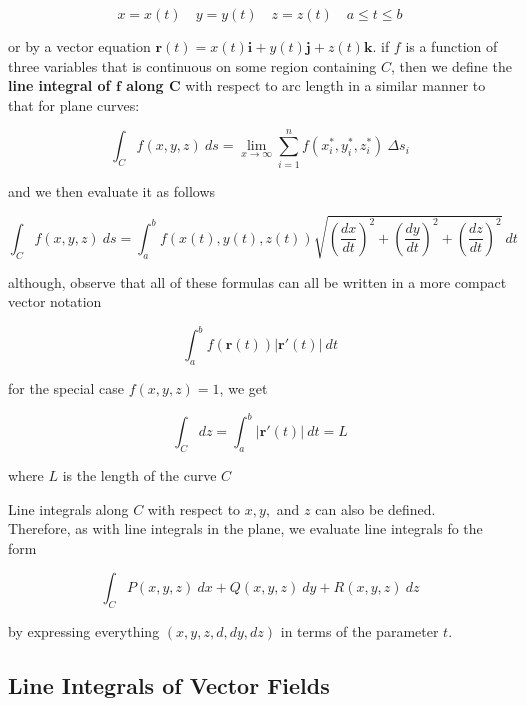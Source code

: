 \documentclass{article}
\begin{document}
\begin{equation*}
    x = x(t) \quad y = y(t) \quad z = z(t) \quad a \leq t \leq b
\end{equation*}

or by a vector equation $\mathbf{r}(t) = x(t) \mathbf{i} + y(t) \mathbf{j} + z(t) \mathbf{k}$. if $f$ is a function of three variables that is continuous on some region containing $C$, then we define the \textbf{ line integral of $\mathbf{f}$ along $\mathbf{C}$} with respect to arc length in a similar manner to that for plane curves:

\begin{equation*}
    \int_C f(x,y,z) \ ds = \lim_{x \rightarrow \infty} \sum_{i=1}^{n} f(x_i^*, y_i^*, z_i^*) \ \Delta s_i
\end{equation*}

and we then evaluate it as follows

\begin{equation*}
    \int_C f(x,y,z) \ ds = \int_{a}^{b} f(x(t), y(t), z(t)) \sqrt{(\frac{dx}{dt})^2 + (\frac{dy}{dt})^2 + (\frac{dz}{dt})^2} \ dt
\end{equation*}

although, observe that all of these formulas can all be written in a more compact vector notation 

\begin{equation*}
    \int_{a}^{b} f(\mathbf{r}(t)) \rvert \mathbf{r}'(t) \rvert \ dt 
\end{equation*}

for the special case $f(x,y,z) = 1$, we get 

\begin{equation*}
    \int_C dz = \int_{a}^{b} \rvert \mathbf{r}'(t) \rvert \ dt = L 
\end{equation*}

where $L$ is the length of the curve $C$

Line integrals along $C$ with respect to  $x, y, $ and $z$ can also be defined.
\\
Therefore, as with line integrals in the plane, we evaluate line integrals fo the form

\begin{equation*}
    \int_C P(x,y,z) \ dx + Q(x,y,z) \ dy + R(x,y,z) \ dz
\end{equation*}

by expressing everything $(x, y,z,d,dy,dz)$ in terms of the parameter $t$.

\subsection{Line Integrals of Vector Fields}
\end{document}
